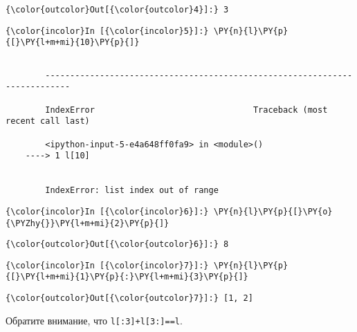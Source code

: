             \begin{Verbatim}[commandchars=\\\{\}]
{\color{outcolor}Out[{\color{outcolor}4}]:} 3
\end{Verbatim}
        
    \begin{Verbatim}[commandchars=\\\{\}]
{\color{incolor}In [{\color{incolor}5}]:} \PY{n}{l}\PY{p}{[}\PY{l+m+mi}{10}\PY{p}{]}
\end{Verbatim}

    \begin{Verbatim}[commandchars=\\\{\}]

        ---------------------------------------------------------------------------

        IndexError                                Traceback (most recent call last)

        <ipython-input-5-e4a648ff0fa9> in <module>()
    ----> 1 l[10]
    

        IndexError: list index out of range

    \end{Verbatim}

    \begin{Verbatim}[commandchars=\\\{\}]
{\color{incolor}In [{\color{incolor}6}]:} \PY{n}{l}\PY{p}{[}\PY{o}{\PYZhy{}}\PY{l+m+mi}{2}\PY{p}{]}
\end{Verbatim}

            \begin{Verbatim}[commandchars=\\\{\}]
{\color{outcolor}Out[{\color{outcolor}6}]:} 8
\end{Verbatim}
        
    \begin{Verbatim}[commandchars=\\\{\}]
{\color{incolor}In [{\color{incolor}7}]:} \PY{n}{l}\PY{p}{[}\PY{l+m+mi}{1}\PY{p}{:}\PY{l+m+mi}{3}\PY{p}{]}
\end{Verbatim}

            \begin{Verbatim}[commandchars=\\\{\}]
{\color{outcolor}Out[{\color{outcolor}7}]:} [1, 2]
\end{Verbatim}
        
    Обратите внимание, что \texttt{l{[}:3{]}+l{[}3:{]}==l}.

